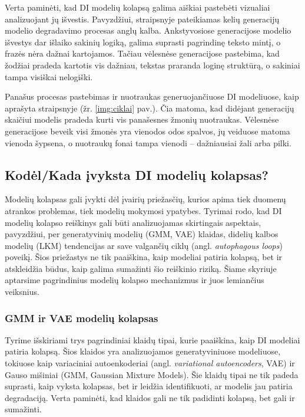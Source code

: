 \documentclass{VUMIFInfKursinis}
\begin{document}
Verta paminėti, kad DI modelių kolapsą galima aiškiai pastebėti vizualiai analizuojant jų išvestis. Pavyzdžiui, straipsnyje \cite{AICollapseNature} pateikiamas kelių generacijų modelio degradavimo procesas anglų kalba. Ankstyvosiose generacijose modelio išvestys dar išlaiko sakinių logiką, galima suprasti pagrindinę teksto mintį, o frazės nėra dažnai kartojamos. Tačiau vėlesnėse generacijose pastebima, kad žodžiai pradeda kartotis vis dažniau, tekstas praranda loginę struktūrą, o sakiniai tampa visiškai nelogiški.

Panašus procesas pastebimas ir nuotraukas generuojančiuose DI modeliuose, kaip aprašyta straipsnyje \cite{ModelsGoMAD} (žr. \ref{img:ciklai} pav.). Čia matoma, kad didėjant generacijų skaičiui modelis pradeda kurti vis panašesnes žmonių nuotraukas. Vėlesnėse generacijose beveik visi žmonės yra vienodos odos spalvos, jų veiduose matoma vienoda šypsena, o nuotraukų fonai tampa vienodi – dažniausiai žali arba pilki. 

\subsection{Kodėl/Kada įvyksta DI modelių kolapsas?}
Modelių kolapsas gali įvykti dėl įvairių priežasčių, kurios apima tiek duomenų atrankos problemas, tiek modelių mokymosi ypatybes. Tyrimai rodo, kad DI modelių kolapso reiškinys gali būti analizuojamas skirtingais aspektais, pavyzdžiui, per generatyvinių modelių (GMM, VAE) klaidas, didelių kalbos modelių (LKM) tendencijas ar save valgančių ciklų (angl. \textsl{autophagous loops}) poveikį. Šios priežastys ne tik paaiškina, kaip modeliai patiria kolapsą, bet ir atskleidžia būdus, kaip galima sumažinti šio reiškinio riziką. Šiame skyriuje aptarsime pagrindinius modelių kolapso mechanizmus ir juos lemiančius veiksnius. 


\subsubsection{GMM ir VAE modelių kolapsas}

Tyrime \cite{AICollapseNature} išskiriami trys pagrindiniai klaidų tipai, kurie paaiškina, kaip DI modeliai patiria kolapsą. Šios klaidos yra analizuojamos generatyviniuose modeliuose, tokiuose kaip variaciniai autoenkoderiai (angl. \textsl{variational autoencoders}, VAE) ir Gauso mišiniai (GMM, Gaussian Mixture Models). Šie klaidų tipai ne tik padeda suprasti, kaip vyksta kolapsas, bet ir leidžia identifikuoti, ar modelis jau patiria degradaciją. Verta paminėti, kad klaidos gali ne tik padidinti kolapsą, bet gali ir sumažinti.
\end{document}

